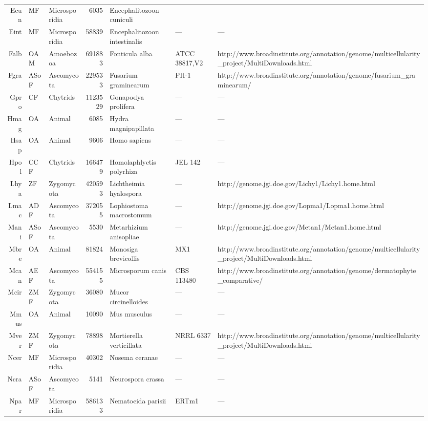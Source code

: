 {{\begin{longtable}{rllrlll}
  Ecun & MF & Microsporidia & 6035 & Encephalitozoon cuniculi & --- & --- \\ 
  Eint & MF & Microsporidia & 58839 & Encephalitozoon intestinalis & --- & --- \\ 
  Falb & OAM & Amoebozoa & 691883 & Fonticula alba & ATCC 38817,V2 & http://www.broadinstitute.org/annotation/genome/multicellularity\_project/MultiDownloads.html \\ 
  Fgra & ASoF & Ascomycota & 229533 & Fusarium graminearum  & PH-1 & http://www.broadinstitute.org/annotation/genome/fusarium\_graminearum/ \\ 
  Gpro & CF & Chytrids & 1123529 & Gonapodya prolifera & --- & --- \\ 
  Hmag & OA & Animal & 6085 & Hydra magnipapillata & --- & --- \\ 
  Hsap & OA & Animal & 9606 & Homo sapiens & --- & --- \\ 
  Hpol & CCF & Chytrids & 166479 & Homolaphlyctis polyrhiza & JEL 142 & --- \\ 
  Lhya & ZF & Zygomycota & 420593 & Lichtheimia hyalospora & --- & http://genome.jgi.doe.gov/Lichy1/Lichy1.home.html \\ 
  Lmac & ADF & Ascomycota & 372055 & Lophiostoma macrostomum & --- & http://genome.jgi.doe.gov/Lopma1/Lopma1.home.html \\ 
  Mani & ASoF & Ascomycota & 5530 & Metarhizium anisopliae & --- & http://genome.jgi.doe.gov/Metan1/Metan1.home.html \\ 
  Mbre & OA & Animal & 81824 & Monosiga brevicollis & MX1 & http://www.broadinstitute.org/annotation/genome/multicellularity\_project/MultiDownloads.html \\ 
  Mcan & AEF & Ascomycota & 554155 & Microsporum canis & CBS 113480 & http://www.broadinstitute.org/annotation/genome/dermatophyte\_comparative/ \\ 
  Mcir & ZMF & Zygomycota & 36080 & Mucor circinelloides & --- & --- \\ 
  Mmus & OA & Animal & 10090 & Mus musculus & --- & --- \\ 
  Mver & ZMF & Zygomycota & 78898 & Mortierella verticillata & NRRL 6337 & http://www.broadinstitute.org/annotation/genome/multicellularity\_project/MultiDownloads.html \\ 
  Ncer & MF & Microsporidia & 40302 & Nosema ceranae & --- & --- \\ 
  Ncra & ASoF & Ascomycota & 5141 & Neurospora crassa & --- & --- \\ 
  Npar & MF & Microsporidia & 586133 & Nematocida parisii & ERTm1 & --- \\ 

\end{longtable}}}
